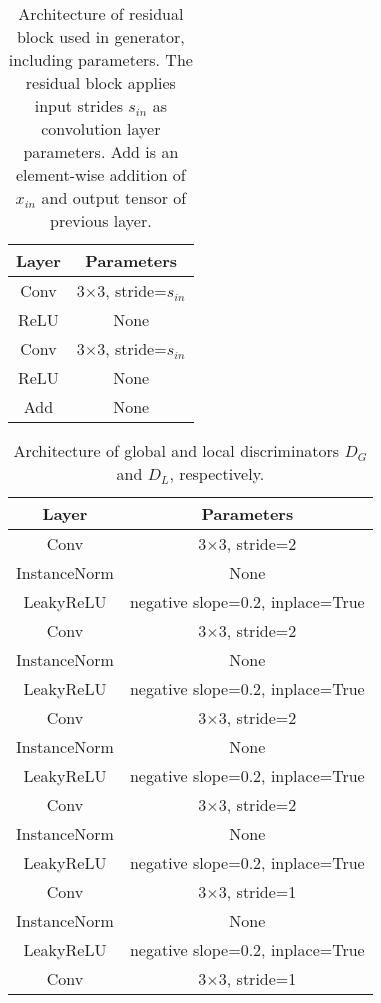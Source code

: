 \documentclass{article}
\begin{document}
\begin{table}[h] 
  \centering  
    \begin{tabular}{c|c}  
    \hline
    \textbf{Layer} & \textbf{Parameters}\\ 
    \hline \hline
      Conv & 3$\times$3, stride=\(s_{in}\) \\
    \hline
      ReLU & None \\
    \hline
      Conv & 3$\times$3, stride=\(s_{in}\) \\
    \hline
      ReLU & None \\
    \hline
      Add & None \\
    \hline
    \end{tabular}
  
  \caption{Architecture of residual block used in generator, including parameters. The residual block applies input strides \(s_{in}\) as convolution layer parameters. Add is an element-wise addition of \(x_{in}\) and output tensor of previous layer.} 
  \label{tab:2}
  \label{table2} 
\end{table}

\begin{table}[h] 
  \centering  
    \begin{tabular}{c|c}  
    \hline
    \textbf{Layer} & \textbf{Parameters}\\ 
    \hline \hline
      Conv & 3$\times$3, stride=2 \\
    \hline
      InstanceNorm & None \\
    \hline
      LeakyReLU & negative slope=0.2, inplace=True \\
    \hline
      Conv & 3$\times$3, stride=2 \\
    \hline
      InstanceNorm & None \\
    \hline
      LeakyReLU & negative slope=0.2, inplace=True \\
    \hline
      Conv & 3$\times$3, stride=2 \\
    \hline
      InstanceNorm & None \\
    \hline
      LeakyReLU & negative slope=0.2, inplace=True \\
    \hline
      Conv & 3$\times$3, stride=2 \\
    \hline
      InstanceNorm & None \\
    \hline
      LeakyReLU & negative slope=0.2, inplace=True \\
    \hline
      Conv & 3$\times$3, stride=1 \\
    \hline
      InstanceNorm & None \\
    \hline
      LeakyReLU & negative slope=0.2, inplace=True \\
    \hline
      Conv & 3$\times$3, stride=1 \\
    \hline
    
    \end{tabular}
  
  \caption{Architecture of global and local discriminators $D_G$ and $D_L$, respectively.} 
  \label{tab:3}
  \label{table3} 
\end{table}
\end{document}
